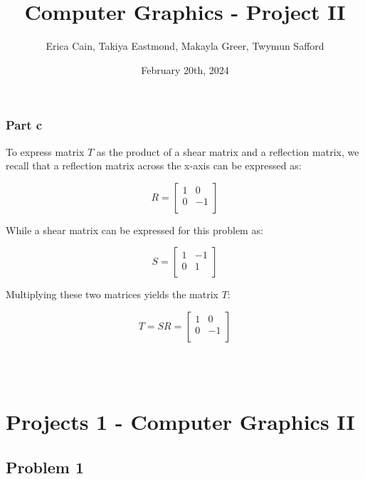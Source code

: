 \documentclass{article}
\begin{document}
\subsubsection*{Part c}

To express matrix $T$ as the product of a shear matrix and a reflection matrix, we recall that a reflection
matrix across the x-axis can be expressed as:

\[
  R =
  \left[ {\begin{array}{cc}
    1 & 0 \\
    0 & -1 \\
  \end{array} } \right]
\]

While a shear matrix can be expressed for this problem as:

\[
  S =
  \left[ {\begin{array}{cc}
    1 & -1 \\
    0 & 1 \\
  \end{array} } \right]
\]

Multiplying these two matrices yields the matrix $T$:

\[
  T = SR= 
  \left[ {\begin{array}{cc}
    1 & 0 \\
    0 & -1 \\
  \end{array} } \right]
\]

\pagebreak

\title{Computer Graphics - Project II}
\author{Erica Cain, Takiya Eastmond, Makayla Greer, Twymun Safford}
\date{February 20th, 2024}

\begin{titlingpage}
    \begin{center}
        \vspace*{3cm}
        {\Huge \thetitle}\\[0.5cm]
        {\Large \theauthor}\\[2cm]
        {\large \thedate}
    \end{center}
\end{titlingpage}


\section*{Projects 1 - Computer Graphics II}

\subsection*{Problem 1}
\end{document}
